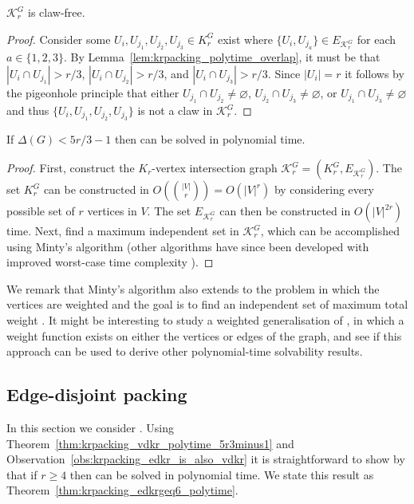 \begin{lem}
$\mathcal{K}_r^G$ is claw-free.
\end{lem}
\begin{proof}
Consider some $U_i, U_{j_1}, U_{j_2}, U_{j_3} \in K_r^G$ exist where $\{ U_i, U_{j_a} \} \in E_{\mathcal{K}_r^G}$ for each $a \in \{1, 2, 3\}$. By Lemma~\ref{lem:krpacking_polytime_overlap}, it must be that $|U_i \cap U_{j_1}| > r/3$, $|U_i \cap U_{j_2}| > r/3$, and $|U_i \cap U_{j_3}| > r/3$. Since $|U_i|=r$ it follows by the pigeonhole principle that either $U_{j_1} \cap U_{j_2} \neq \varnothing$, $U_{j_2} \cap U_{j_3} \neq \varnothing$, or $U_{j_1} \cap U_{j_3} \neq \varnothing$ and thus $\{ U_i, U_{j_1}, U_{j_2}, U_{j_3} \}$ is not a claw in $\mathcal{K}_r^G$.
\end{proof}

\begin{thm}
\label{thm:krpacking_vdkr_polytime_5r3minus1}
If $\Delta(G)<5r/3-1$ then \vdkr can be solved in polynomial time.
\end{thm}
\begin{proof}
First, construct the $K_r$-vertex intersection graph $\mathcal{K}_r^G = (K_r^G, E_{\mathcal{K}_r^G})$. The set $K_r^G$ can be constructed in $O(\binom{|V|}{r})=O(|V|^r)$ by considering every possible set of $r$ vertices in $V$. The set $E_{\mathcal{K}_r^G}$ can then be constructed in $O(|V|^{2r})$ time. Next, find a maximum independent set in $\mathcal{K}_r^G$, which can be accomplished using Minty's algorithm (other algorithms have since been developed with improved worst-case time complexity \cite{FOS11}).
\end{proof}

We remark that Minty's algorithm also extends to the problem in which the vertices are weighted and the goal is to find an independent set of maximum total weight \cite{Nakamura01}. It might be interesting to study a weighted generalisation of \vdkr, in which a weight function exists on either the vertices or edges of the graph, and see if this approach can be used to derive other polynomial-time solvability results.

\subsection{Edge-disjoint packing} 

In this section we consider \edkr. Using Theorem~\ref{thm:krpacking_vdkr_polytime_5r3minus1} and Observation~\ref{obs:krpacking_edkr_is_also_vdkr} it is straightforward to show by that if $r \geq 4$ then \edkr can be solved in polynomial time. We state this result as Theorem~\ref{thm:krpacking_edkrgeq6_polytime}.

